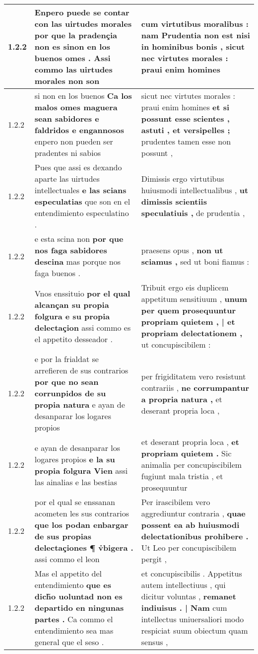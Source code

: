 \begin{tabular}{|p{1cm}|p{6.5cm}|p{6.5cm}|}
1.2.2 & Enpero puede se contar con las uirtudes morales \textbf{ por que la pradençia non es sinon en los buenos omes . } Assi commo las uirtudes morales non son & cum virtutibus moralibus : \textbf{ nam Prudentia non est nisi in hominibus bonis , } sicut nec virtutes morales : praui enim homines \\\hline
1.2.2 & si non en los buenos \textbf{ Ca los malos omes maguera sean sabidores e faldridos e engannosos } enpero non pueden ser pradentes ni sabios & sicut nec virtutes morales : praui enim homines \textbf{ et si possunt esse scientes , astuti , et versipelles ; } prudentes tamen esse non possunt , \\\hline
1.2.2 & Pues que assi es dexando aparte las uirtudes intellectuales \textbf{ e las scians especulatias } que son en el entendimiento especulatino . & Dimissis ergo virtutibus huiusmodi intellectualibus , \textbf{ ut dimissis scientiis speculatiuis , } de prudentia , \\\hline
1.2.2 & e esta scina non \textbf{ por que nos faga sabidores descina } mas porque nos faga buenos . & praesens opus , \textbf{ non ut sciamus , } sed ut boni fiamus : \\\hline
1.2.2 & Vnos enssituio \textbf{ por el qual alcançan su propia folgura e su propia delectaçion } assi commo es el appetito desseador . & Tribuit ergo eis duplicem appetitum sensitiuum , \textbf{ unum per quem prosequuntur propriam quietem , | et propriam delectationem , } ut concupiscibilem : \\\hline
1.2.2 & e por la frialdat se arrefieren de sus contrarios \textbf{ por que no sean corrunpidos de su propia natura } e ayan de desanparar los logares propios & per frigiditatem vero resistunt contrariis , \textbf{ ne corrumpantur a propria natura , } et deserant propria loca , \\\hline
1.2.2 & e ayan de desanparar los logares propios \textbf{ e la su propia folgura Vien } assi las ainalias e las bestias & et deserant propria loca , \textbf{ et propriam quietem . } Sic animalia per concupiscibilem fugiunt mala tristia , et prosequuntur \\\hline
1.2.2 & por el qual se enssanan acometen les sus contrarios \textbf{ que los podan enbargar de sus propias delectaçiones ¶ v̉bigera . } assi commo el leon & Per irascibilem vero aggrediuntur contraria , \textbf{ quae possent ea ab huiusmodi delectationibus prohibere . } Ut Leo per concupiscibilem pergit , \\\hline
1.2.2 & Mas el appetito del entendimiento \textbf{ que es dich̃o uoluntad non es departido en ningunas partes . } Ca commo el entendimiento sea mas general que el seso . & et concupiscibilis . Appetitus autem intellectiuus , qui dicitur voluntas , \textbf{ remanet indiuisus . | Nam } cum intellectus uniuersaliori modo respiciat suum obiectum quam sensus , \\\hline

\end{tabular}
